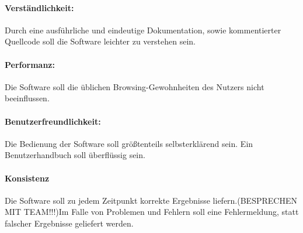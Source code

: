 \documentclass[11pt]{scrreprt}
\begin{document}
\paragraph{Verständlichkeit:} Durch eine ausführliche und eindeutige Dokumentation, sowie kommentierter Quellcode soll die Software leichter zu verstehen sein.

\paragraph{Performanz:} Die Software soll die üblichen Browsing-Gewohnheiten des Nutzers nicht beeinflussen.

\paragraph{Benutzerfreundlichkeit:} Die Bedienung der Software soll größtenteils selbsterklärend sein. Ein Benutzerhandbuch soll überflüssig sein.

\paragraph{Konsistenz} Die Software soll zu jedem Zeitpunkt korrekte Ergebnisse liefern.(BESPRECHEN MIT TEAM!!!)Im Falle von Problemen und Fehlern soll eine Fehlermeldung, statt falscher Ergebnisse geliefert werden.
\end{document}
